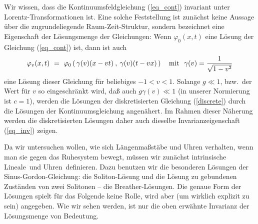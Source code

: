 Wir wissen, dass die Kontinuumsfeldgleichung (\ref{eq_cont}) invariant
unter Lorentz-Transformationen ist. Eine solche Feststellung ist
zun\"achst keine Aussage \"uber die zugrundeliegende Raum-Zeit-Struktur, 
sondern bezeichnet eine Eigenschaft der 
L\"osungs\-menge der Gleichungen: 
Wenn $\varphi_0(x,t)$ eine L\"osung der Gleichung (\ref{eq_cont}) ist, dann ist 
auch
\begin{equation}
\label{eq_inv}
   \varphi_v(x,t) ~=~
   \varphi_0\left(\,\gamma(v)(x-vt)\:,\:
                \gamma(v) (t-  v x)\, \right)
   ~~~{\rm mit}~~ \gamma(v) = \frac{1}{\sqrt{1-v^2}}
\end{equation}
eine L\"osung dieser Gleichung f\"{u}r beliebiges $-1<v<1$. Solange $g\ll 1$,
bzw.\ der Wert f\"{u}r $v$ so eingeschr\"ankt wird, da{\ss} auch $g\gamma(v)\ll 1$
(in unserer Normierung ist $c=1$), werden die L\"osungen der diskretisierten
Gleichung (\ref{discrete}) durch die L\"osungen der 
Kon\-ti\-nuums\-gleichung angen\"ahert. 
Im Rahmen dieser N\"aherung werden die diskretisierten
L\"osungen daher auch dieselbe Invarianzeigenschaft (\ref{eq_inv}) zeigen. 

Da wir untersuchen wollen, wie sich L\"angenma\ss st\"abe und Uhren
verhalten, wenn man sie gegen das Ruhesystem bewegt, m\"ussen wir
zun\"achst intrinsische \glqq Lineale\grqq\ und \glqq Uhren\grqq\ definieren. Dazu
benutzen wir die besonderen L\"osungen
der Sinus-Gordon-Gleichung: die Soliton-L\"{o}sung und die L\"osung zu
gebundenen Zust\"{a}nden von zwei Solitonen -- die Breather-L\"osungen.
Die genaue Form der L\"osungen spielt f\"ur das Folgende
keine Rolle, wird aber (um wirklich explizit zu sein) angegeben.
Wie wir sehen werden, ist nur die oben erw\"ahnte Invarianz
der L\"osungsmenge von Bedeutung.

